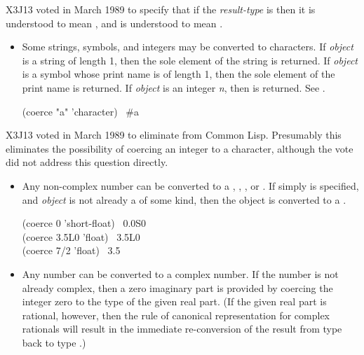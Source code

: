 \begin{defun}[Function]
\begin{newer}
X3J13 voted in March 1989 
to specify that if the \emph{result-type} is 
then it is understood to mean ,
and  is understood to mean .
\end{newer}

\begin{obsolete}
\begin{itemize}
\item
Some strings, symbols, and integers may be converted to characters.
If \emph{object} is a string of length 1, then the
sole element of the string is returned.  If \emph{object} is a symbol
whose print name is of length 1, then the sole element of the print name
is returned.  If \emph{object} is an integer \emph{n}, then 
is returned.  See .
\begin{lisp}
(coerce "a" 'character) \EV\ \#{\Xbackslash}a
\end{lisp}
\end{itemize}
\end{obsolete}

\begin{newer}
X3J13 voted in March 1989 
to eliminate  from Common Lisp.
Presumably this eliminates the possibility of coercing an
integer to a character, although the vote did not address
this question directly.
\end{newer}

\begin{itemize}
\item
Any non-complex number can be converted to a ,
, , or .  If simply 
is specified, and \emph{object} is not already a  of some kind, then
the object is converted to a .
\begin{lisp}
(coerce 0 'short-float) \EV\ 0.0S0 \\
(coerce 3.5L0 'float) \EV\ 3.5L0 \\
(coerce 7/2 'float) \EV\ 3.5
\end{lisp}

\item
Any number can be converted to a complex number.
If the number is not already complex, then a zero imaginary part
is provided by coercing the integer zero to the type of the given real part.
(If the given real part is rational, however, then the rule of
canonical representation for complex rationals will result
in the immediate re-conversion of the result from type 
back to type .)


\end{itemize}
\end{defun}

